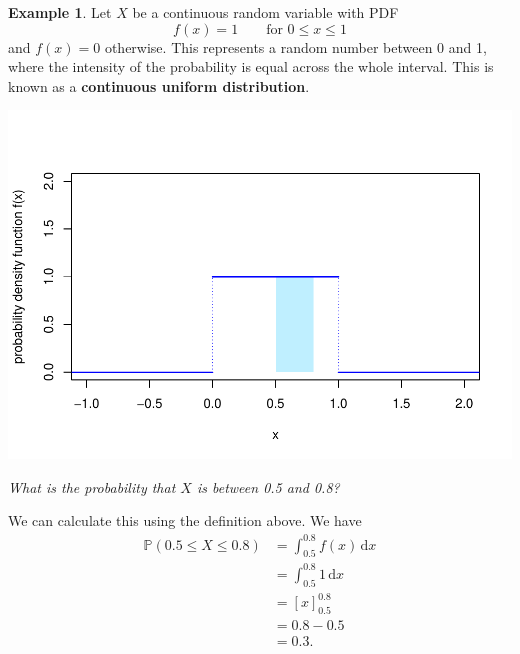 \documentclass[
  a4paper,
]{book}
\theoremstyle{definition}
\theoremstyle{definition}
\newtheorem{example}{Example}[chapter]
\theoremstyle{definition}
\theoremstyle{definition}
\theoremstyle{remark}
\begin{document}
\begin{example}
\protect\hypertarget{exm:unifex}{}\label{exm:unifex}Let \(X\) be a continuous random variable with PDF
\[  f(x) = 1 \qquad \text{for $0 \leq x \leq 1$} \]
and \(f(x) = 0\) otherwise. This represents a random number between 0 and 1, where the intensity of the probability is equal across the whole interval. This is known as a \textbf{continuous uniform distribution}.

\includegraphics{math1710_files/figure-latex/contunif-pdf-1.pdf}

\emph{What is the probability that \(X\) is between 0.5 and 0.8?}

We can calculate this using the definition above. We have
\begin{align*}
  \mathbb P(0.5 \leq X \leq 0.8) &= \int_{0.5}^{0.8} f(x) \, \mathrm dx \\
    &= \int_{0.5}^{0.8} 1 \, \mathrm dx \\
    &= [x]_{0.5}^{0.8} \\
    &= 0.8 - 0.5 \\
    &= 0.3 .
\end{align*}
\end{example}
\end{document}
